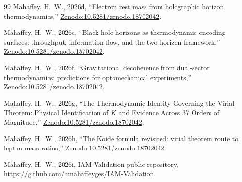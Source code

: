 \documentclass[12pt,a4paper]{article}
\begin{document}
\begin{thebibliography}{99}
Mahaffey, H.~W., 2026d, ``Electron rest mass from holographic horizon
thermodynamics,''
\href{https://doi.org/10.5281/zenodo.18702042}{Zenodo:10.5281/zenodo.18702042}.

Mahaffey, H.~W., 2026e, ``Black hole horizons as thermodynamic encoding
surfaces: throughput, information flow, and the two-horizon framework,''
\href{https://doi.org/10.5281/zenodo.18702042}{Zenodo:10.5281/zenodo.18702042}.

Mahaffey, H.~W., 2026f, ``Gravitational decoherence from dual-sector
thermodynamics: predictions for optomechanical experiments,''
\href{https://doi.org/10.5281/zenodo.18702042}{Zenodo:10.5281/zenodo.18702042}.

Mahaffey, H.~W., 2026g, ``The Thermodynamic Identity Governing the Virial
Theorem: Physical Identification of $K$ and Evidence Across 37 Orders of
Magnitude,''
\href{https://doi.org/10.5281/zenodo.18702042}{Zenodo:10.5281/zenodo.18702042}.

Mahaffey, H.~W., 2026h, ``The Koide formula revisited: virial theorem
route to lepton mass ratios,''
\href{https://doi.org/10.5281/zenodo.18702042}{Zenodo:10.5281/zenodo.18702042}.

Mahaffey, H.~W., 2026i, IAM-Validation public repository,
\url{https://github.com/hmahaffeyges/IAM-Validation}.

\end{thebibliography}
\end{document}
